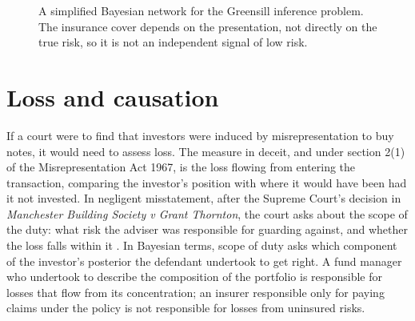 \begin{figure}[t]
\centering
{}
\caption{A simplified Bayesian network for the Greensill inference problem. The insurance cover depends on the presentation, not directly on the true risk, so it is not an independent signal of low risk.}
\label{fig:greensillbn}
\end{figure}

\section{Loss and causation}

If a court were to find that investors were induced by misrepresentation to buy notes, it would need to assess loss. The measure in deceit, and under section 2(1) of the Misrepresentation Act 1967, is the loss flowing from entering the transaction, comparing the investor's position with where it would have been had it not invested. In negligent misstatement, after the Supreme Court's decision in \emph{Manchester Building Society v Grant Thornton}, the court asks about the scope of the duty: what risk the adviser was responsible for guarding against, and whether the loss falls within it \citep{mbs2021}. In Bayesian terms, scope of duty asks which component of the investor's posterior the defendant undertook to get right. A fund manager who undertook to describe the composition of the portfolio is responsible for losses that flow from its concentration; an insurer responsible only for paying claims under the policy is not responsible for losses from uninsured risks.

